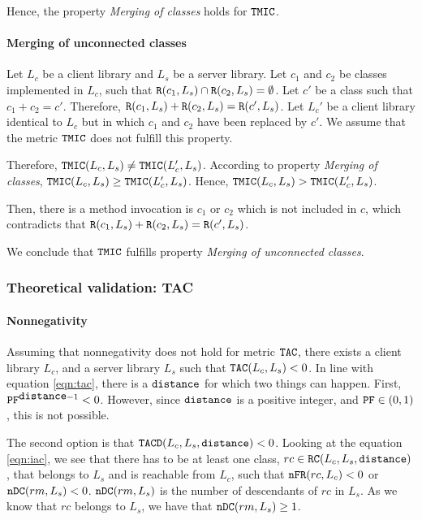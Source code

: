 Hence, the property \textit{Merging of classes} holds for $\verb|TMIC|$.

\paragraph{Merging of unconnected classes}
Let $L_c$ be a client library and $L_s$ be a server library. Let $c_1$ and $c_2$ be classes implemented in $L_c$, such that $\verb|R|(c_1, L_s) \cap \verb|R|(c_2, L_s) = \emptyset$. Let $c'$ be a class such that $c_1 + c_2 = c'$. Therefore, $\verb|R|(c_1, L_s) + \verb|R|(c_2, L_s) = \verb|R|(c', L_s)$. Let $L_c'$ be a client library identical to $L_c$ but in which $c_1$ and $c_2$ have been replaced by $c'$. We assume that the metric $\verb|TMIC|$ does not fulfill this property.

Therefore, $\verb|TMIC|(L_c, L_s) \neq \verb|TMIC|(L_c', L_s)$. According to property \textit{Merging of classes}, $\verb|TMIC|(L_c, L_s) \geq \verb|TMIC|(L_c', L_s)$. Hence, $\verb|TMIC|(L_c, L_s) > \verb|TMIC|(L_c', L_s)$.

Then, there is a method invocation is $c_1$ or $c_2$ which is not included in $c$, which contradicts that $\verb|R|(c_1, L_s) + \verb|R|(c_2, L_s) = \verb|R|(c', L_s)$.

We conclude that $\verb|TMIC|$ fulfills property \textit{Merging of unconnected classes}.

\subsubsection{Theoretical validation: TAC}

\paragraph{Nonnegativity}
Assuming that nonnegativity does not hold for metric $\verb|TAC|$, there exists a client library $L_c$, and a server library $L_s$ such that $\verb|TAC|(L_c, L_s) < 0$. In line with equation \ref{eqn:tac}, there is a $\verb|distance|$ for which two things can happen. First, $\verb|PF|^{\verb|distance| - 1} < 0$. However, since $\verb|distance|$ is a positive integer, and $\verb|PF| \in (0,1)$, this is not possible.

The second option is that $\verb|TACD|(L_c,L_s, \verb|distance|) < 0$. Looking at the equation \ref{eqn:iac}, we see that there has to be at least one class, $rc \in \verb|RC|(L_c,L_s,\verb|distance|)$, that belongs to $L_s$ and is reachable from $L_c$, such that $\verb|nFR|(rc,L_c) < 0$ or $\verb|nDC|(rm, L_s) < 0$. $\verb|nDC|(rm, L_s)$ is the number of descendants of $rc$ in $L_s$. As we know that $rc$ belongs to $L_s$, we have that $\verb|nDC|(rm, L_s) \geq 1$.

